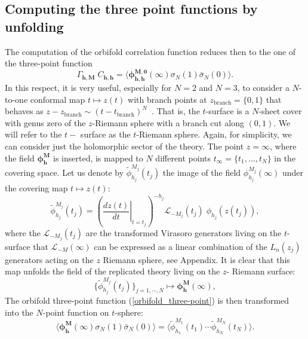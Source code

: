 \documentclass[a4paper,11pt]{article}
\begin{document}
\subsection{Computing the three point functions by unfolding}
The computation of the orbifold correlation function reduces then to the one of the three-point function
\begin{equation}\label{orbifold_three-point}
 \Gamma_{\boldsymbol{h},\boldsymbol{M}} \;C_{\boldsymbol{h},\boldsymbol{h}} = \langle \boldsymbol{\phi}^{\boldsymbol{M},\boldsymbol{0}}_{\boldsymbol{h},\boldsymbol{h}}(\infty) \sigma_{N}(1)\bar{\sigma}_{N}(0)\rangle.
\end{equation}
In this respect, it is very useful, especially for $N=2$ and $N=3$,  to consider a $N$-to-one conformal map
$t\mapsto z(t)$ with branch points at $z_{\text{branch}}=\{0, 1\}$  that behaves as $z-z_{\text{branch}}\sim (t-t_{\text{branch}})^N$~\cite{Lunin}.
That is, the $t$-surface is a $N$-sheet cover with genus zero 
 of the $z$-Riemann sphere with a branch cut along 
$(0,1)$. We will refer to the $t-$ surface as the $t$-Riemann sphere. Again, for simplicity, we can consider just the holomorphic sector of the theory. The point $z=\infty$, where the field $\boldsymbol{\phi}^{\boldsymbol{M}}_{\boldsymbol{h}}$  is inserted, is mapped to $N$ different points $t_\infty=\{t_1, \dots, t_N\}$ in 
the covering space. Let us denote by $\tilde{\phi}_{h_j}^{M_j}(t_j)$ the image
of the field $\phi_{h_j}^{M_j}(\infty)$ under the covering map $t\mapsto z(t)$:
\begin{equation}
\label{Jac}
\tilde{\phi}_{h_j}^{M_j}(t_j) = \left(\left.\frac{d z(t)}{d t}\right|_{t=t_j} \right)^{-h_j} \mathcal{L}_{-M_j}(t_j)\;\phi_{h_j} (z(t_j)),
\end{equation}
where the $\mathcal{L}_{-M_j}(t_j)$ are the transformed Virasoro generators living on the $t$- surface that  $\mathcal{L}_{-M}(\infty)$ can be expressed as a linear combination of the $L_{n}(z_j)$ generators acting on the $z$ Riemann sphere, see Appendix. 
It is clear that this map unfolds the field of the replicated theory living on the $z$- Riemann surface:
\begin{equation}
\{\tilde{\phi}_{h_j}^{M_j}(t_j)\}_{j=1,\cdots,N}\mapsto \boldsymbol{\phi}_{\boldsymbol{h}}^{\boldsymbol{M}}(\infty),
\end{equation}
The  orbifold  three-point function (\ref{orbifold_three-point})  is then transformed into the $N$-point function on $t$-sphere:
\begin{equation}\label{N-point}
\langle \boldsymbol{\phi}^{\boldsymbol{M}}_{\boldsymbol{h}}(\infty) \sigma_{N}(1)\bar{\sigma}_{N}(0)\rangle=\langle \tilde{\phi}^{M_1}_{h_1}(t_1)\cdots\tilde{\phi}_{h_N}^{M_N}(t_N)\rangle.
\end{equation}
\end{document}
